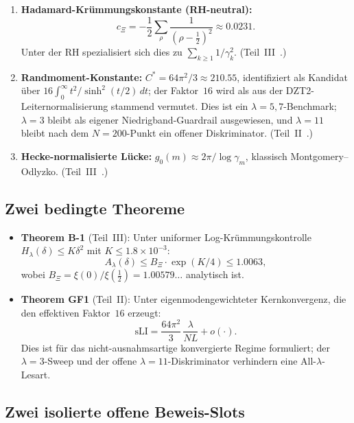 \documentclass[12pt,a4paper]{article}
\theoremstyle{definition}
\theoremstyle{remark}
\begin{document}
\begin{enumerate}
  \item \textbf{Hadamard-Krümmungskonstante (RH-neutral):}
    \[
      c_\Xi = -\frac{1}{2}\sum_\rho
              \frac{1}{(\rho-\tfrac{1}{2})^2}
            \approx 0.0231.
    \]
    Unter der RH spezialisiert sich dies zu $\sum_{k\geq 1} 1/\gamma_k^2$.
    (Teil~III~\cite{Geiger2026partIII}.)

  \item \textbf{Randmoment-Konstante:}
    $C^* = 64\pi^2/3 \approx 210.55$,
    identifiziert als Kandidat über
    $16\int_0^\infty t^2/\sinh^2(t/2)\,dt$; der Faktor~$16$ wird
    als aus der DZT2-Leiternormalisierung stammend vermutet. Dies ist
    ein $\lambda=5,7$-Benchmark; $\lambda=3$ bleibt als eigener
    Niedrigband-Guardrail ausgewiesen, und $\lambda=11$ bleibt nach dem
    $N=200$-Punkt ein offener Diskriminator.
    (Teil~II~\cite{Geiger2026partII}.)

  \item \textbf{Hecke-normalisierte Lücke:}
    $g_0(m) \approx 2\pi/\log\gamma_m$, klassisch
    Montgomery--Odlyzko.
    (Teil~III~\cite{Geiger2026partIII}.)
\end{enumerate}

\subsection{Zwei bedingte Theoreme}

\begin{itemize}
  \item \textbf{Theorem B-1} (Teil~III): Unter uniformer
    Log-Krümmungskontrolle $H_\lambda(\delta) \leq K\delta^2$ mit
    $K \leq 1.8\times 10^{-3}$:
    \[
      A_\lambda(\delta)
      \leq B_\Xi \cdot \exp(K/4) \leq 1.0063,
    \]
    wobei $B_\Xi = \xi(0)/\xi(\tfrac{1}{2}) = 1.00579\ldots$
    analytisch ist.

  \item \textbf{Theorem GF1} (Teil~II): Unter eigenmodengewichteter
    Kernkonvergenz, die den effektiven Faktor~$16$ erzeugt:
    \[
      \mathrm{sLI}
      = \frac{64\pi^2}{3}\,\frac{\lambda}{NL} + o(\cdot).
    \]
    Dies ist für das nicht-ausnahmsartige konvergierte Regime formuliert;
    der $\lambda=3$-Sweep und der offene $\lambda=11$-Diskriminator
    verhindern eine All-$\lambda$-Lesart.
\end{itemize}


\subsection{Zwei isolierte offene Beweis-Slots}
\end{document}
